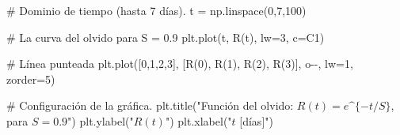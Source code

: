 \documentclass[
  letterpaper,
  DIV=11,
  numbers=noendperiod]{scrreprt}
\newenvironment{Shaded}{\begin{snugshade}}{\end{snugshade}}
\newcommand{\CommentTok}[1]{\textcolor[rgb]{0.37,0.37,0.37}{#1}}
\newcommand{\DecValTok}[1]{\textcolor[rgb]{0.68,0.00,0.00}{#1}}
\newcommand{\NormalTok}[1]{\textcolor[rgb]{0.00,0.23,0.31}{#1}}
\newcommand{\OperatorTok}[1]{\textcolor[rgb]{0.37,0.37,0.37}{#1}}
\newcommand{\StringTok}[1]{\textcolor[rgb]{0.13,0.47,0.30}{#1}}
\begin{document}
\begin{Shaded}
\begin{Highlighting}[]
\CommentTok{\# Dominio de tiempo (hasta 7 días).}
\NormalTok{t }\OperatorTok{=}\NormalTok{ np.linspace(}\DecValTok{0}\NormalTok{,}\DecValTok{7}\NormalTok{,}\DecValTok{100}\NormalTok{)}

\CommentTok{\# La curva del olvido para S = 0.9}
\NormalTok{plt.plot(t, R(t), lw}\OperatorTok{=}\DecValTok{3}\NormalTok{, c}\OperatorTok{=}\StringTok{\textquotesingle{}C1\textquotesingle{}}\NormalTok{)}

\CommentTok{\# Línea punteada}
\NormalTok{plt.plot([}\DecValTok{0}\NormalTok{,}\DecValTok{1}\NormalTok{,}\DecValTok{2}\NormalTok{,}\DecValTok{3}\NormalTok{], [R(}\DecValTok{0}\NormalTok{), R(}\DecValTok{1}\NormalTok{), R(}\DecValTok{2}\NormalTok{), R(}\DecValTok{3}\NormalTok{)], }\StringTok{\textquotesingle{}o{-}{-}\textquotesingle{}}\NormalTok{, lw}\OperatorTok{=}\DecValTok{1}\NormalTok{, zorder}\OperatorTok{=}\DecValTok{5}\NormalTok{)}

\CommentTok{\# Configuración de la gráfica. }
\NormalTok{plt.title(}\StringTok{"Función del olvido: $R(t)=e\^{}\{{-}t/S\}$, para $S = 0.9$"}\NormalTok{)}
\NormalTok{plt.ylabel(}\StringTok{"$R(t)$"}\NormalTok{)}
\NormalTok{plt.xlabel(}\StringTok{"$t$ [días]"}\NormalTok{)}


\end{Highlighting}
\end{Shaded}
\end{document}

